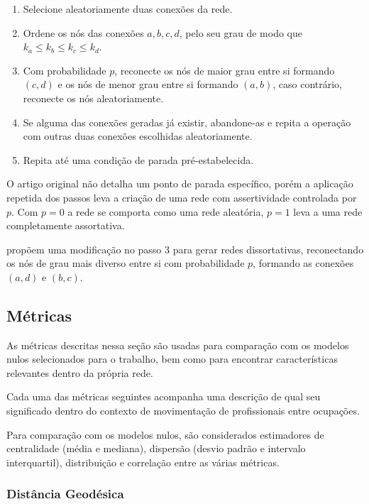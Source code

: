 \documentclass[12pt,a4paper]{article}
\theoremstyle{hypo}
\begin{document}
\begin{enumerate}
\item Selecione aleatoriamente duas conexões da rede.
\item Ordene os nós das conexões $a, b, c, d$, pelo seu grau de modo que $k_a \le k_b \le k_c \le k_d$.
\item Com probabilidade $p$, reconecte os nós de maior grau entre si formando $(c, d)$ e os nós de menor grau entre si formando $(a, b)$, caso contrário, reconecte os nós aleatoriamente.
\item Se alguma das conexões geradas já existir, abandone-as e repita a operação com outras duas conexões escolhidas aleatoriamente.
\item Repita até uma condição de parada pré-estabelecida.  
\end{enumerate}
 
O artigo original não detalha um ponto de parada específico, porém a aplicação repetida dos passos leva a criação de uma rede com assertividade controlada por $p$. Com $p = 0$ a rede se comporta como uma rede aleatória, $p = 1$ leva a uma rede completamente assortativa.
 
 propõem uma modificação no passo 3 para gerar redes dissortativas, reconectando os nós de grau mais diverso entre si com probabilidade $p$, formando as conexões $(a, d)$ e $(b, c)$.

\subsection{Métricas}

As métricas descritas nessa seção são usadas para comparação com os modelos nulos selecionados para o trabalho, bem como para encontrar características relevantes dentro da própria rede.

Cada uma das métricas seguintes acompanha uma descrição de qual seu significado dentro do contexto de movimentação de profissionais entre ocupações.

Para comparação com os modelos nulos, são considerados estimadores de centralidade (média e mediana), dispersão (desvio padrão e intervalo interquartil), distribuição e correlação entre as várias métricas.

\subsubsection{Distância Geodésica} \label{sec:distancia-geodesica}
\end{document}
